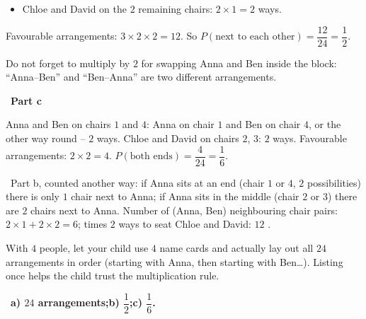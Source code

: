 \documentclass[11pt]{article}
\providecommand{\AnsWord}{Đáp số}
\newcommand{\ans}[1]{\par\smallskip{\bfseries\color{tmGreen!88!black}\AnsWord:}\ {\bfseries\color{AnsRed}#1}\par}
\newcommand{\step}[2]{\par\smallskip\noindent{\bfseries\color{tmBlue!85!black}\StepWord~#1.}\ {\bfseries #2}\par\nopagebreak}
\newcommand{\verify}[1]{\par\smallskip\noindent{\bfseries\color{tmGreen!80!black}\faCheckCircle\ \CheckWord}\ #1\par}
\def\AnsWord{Answer}
\def\StepWord{Step}
\def\CheckWord{Check:}
\begin{document}
{\begin{itemize}[leftmargin=1.2em,itemsep=1pt,topsep=1pt]
\item Chloe and David on the $2$ remaining chairs: $2\times1=2$ ways.
\end{itemize}
Favourable arrangements: $3\times2\times2=12$. So $P(\text{next to each other})=\dfrac{12}{24}=\dfrac12$.
\begin{warnbox}Do not forget to multiply by $2$ for swapping Anna and Ben inside the block: ``Anna--Ben'' and ``Ben--Anna'' are two different arrangements.\end{warnbox}
\step{3}{Part c}
Anna and Ben on chairs $1$ and $4$: Anna on chair $1$ and Ben on chair $4$, or the other way round -- $2$ ways. Chloe and David on chairs $2$, $3$: $2$ ways. Favourable arrangements: $2\times2=4$.
$P(\text{both ends})=\dfrac{4}{24}=\dfrac16$.
\verify{Part b, counted another way: if Anna sits at an end (chair $1$ or $4$, $2$ possibilities) there is only $1$ chair next to Anna; if Anna sits in the middle (chair $2$ or $3$) there are $2$ chairs next to Anna. Number of (Anna, Ben) neighbouring chair pairs: $2\times1+2\times2=6$; times $2$ ways to seat Chloe and David: $12$ \checkmark.}
\begin{parentbox}With $4$ people, let your child use $4$ name cards and actually lay out all $24$ arrangements in order (starting with Anna, then starting with Ben\ldots). Listing once helps the child trust the multiplication rule.\end{parentbox}
\ans{a) $24$ arrangements;\quad b) $\dfrac12$;\quad c) $\dfrac16$.}
}
\end{document}
